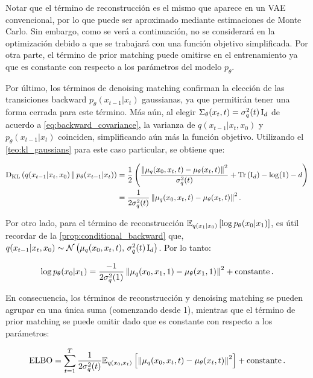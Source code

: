 Notar que el término de reconstrucción es el mismo que aparece en un VAE convencional, por lo que puede ser aproximado mediante estimaciones de Monte Carlo. Sin embargo, como se verá a continuación, no se considerará en la optimización debido a que se trabajará con una función objetivo simplificada. Por otra parte, el término de prior matching puede omitirse en el entrenamiento ya que es constante con respecto a los parámetros del modelo $p_\theta$.

Por último, los términos de denoising matching confirman la elección de las transiciones backward $p_\theta(x_{t-1}|x_t)$ gaussianas, ya que permitirán tener una forma cerrada para este término. Más aún, al elegir $\Sigma_\theta(x_t,t)=\sigma_q^2(t)\operatorname{I}_{d}$ de acuerdo a \eqref{eq:backward_covariance}, la varianza de $q(x_{t-1}|x_t,x_0)$ y $p_\theta(x_{t-1}|x_t)$ coinciden, simplificando aún más la función objetivo. Utilizando el \autoref{teo:kl_gaussians} para este caso particular, se obtiene que:

\begin{align*}
    \operatorname{D_{KL}}\left(q(x_{t-1}|x_t,x_0)\,\|\,p_\theta(x_{t-1}|x_t)\right) & = \frac{1}{2}\left(\frac{\left\lVert \mu_q(x_0,x_t, t)-\mu_\theta(x_t,t) \right\rVert^2}{\sigma_q^2(t)}+\operatorname{Tr}\left(\operatorname{I}_{d}\right)-\log(1)-d\right) \\
                                                   & = \frac{1}{2\sigma_q^2(t)} \left\lVert \mu_q(x_0,x_t, t)-\mu_\theta(x_t,t) \right\rVert^2 .
\end{align*}

Por otro lado, para el término de reconstrucción $\mathbb{E}_{q(x_1|x_0)}\left[\log p_\theta(x_0|x_1)\right]$, es útil recordar de la \autoref{prop:conditional_backward} que, $q(x_{t-1}|x_t,x_0) \sim \mathcal{N}\left(\mu_q(x_0,x_t,t),\,\sigma_q^2(t)\operatorname{I}_{d}\right)$. Por lo tanto:

\begin{equation*}
    \log p_\theta(x_0|x_1) = \frac{-1}{2\sigma_q^2(1)}\left\lVert \mu_q(x_0,x_1,1)-\mu_\theta(x_1,1) \right\rVert^2 + \operatorname{constante} .
\end{equation*}

En consecuencia, los términos de reconstrucción y denoising matching se pueden agrupar en una única suma (comenzando desde 1), mientras que el término de prior matching se puede omitir dado que es constante con respecto a los parámetros:

\begin{equation*}
    \operatorname{ELBO} = \sum_{t=1}^T \frac{1}{2\sigma_q^2(t)} \mathbb{E}_{q(x_0,x_t)}\left[\left\lVert \mu_q(x_0,x_t, t)-\mu_\theta(x_t,t) \right\rVert^2\right] + \operatorname{constante} .
\end{equation*}

